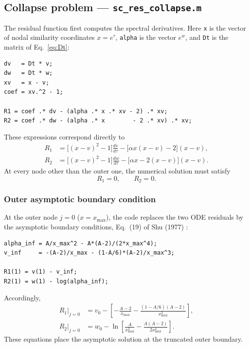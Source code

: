 \documentclass[11pt,a4paper]{article}
\begin{document}
\subsection{Collapse problem --- \texttt{sc\_res\_collapse.m}}
The residual function first computes the spectral derivatives. Here
\texttt{x} is the vector of nodal similarity coordinates $x=e^\tau$,
\texttt{alpha} is the vector $e^{w}$, and \texttt{Dt} is the matrix of
Eq.~\eqref{eq:Dt}:
\begin{lstlisting}[style=matlab]
dv   = Dt * v;
dw   = Dt * w;
xv   = x - v;
coef = xv.^2 - 1;

R1 = coef .* dv - (alpha .* x .* xv - 2) .* xv;
R2 = coef .* dw - (alpha .* x        - 2 .* xv) .* xv;
\end{lstlisting}
These expressions correspond directly to
\begin{align}
R_1 &=
\bigl[(x-v)^2-1\bigr]\frac{dv}{d\tau}
-
\bigl[\alpha x(x-v)-2\bigr](x-v),
\label{eq:R1}\\
R_2 &=
\bigl[(x-v)^2-1\bigr]\frac{dw}{d\tau}
-
\bigl[\alpha x-2(x-v)\bigr](x-v).
\label{eq:R2}
\end{align}
At every node other than the outer one, the numerical solution must
satisfy
\begin{equation}
R_1=0,
\qquad
R_2=0.
\end{equation}

\subsubsection{Outer asymptotic boundary condition}

At the outer node $j=0$ ($x=x_{\max}$), the code replaces the two ODE
residuals by the asymptotic boundary conditions, Eq.~(19) of
Shu (1977) \cite{shu1977}:
\begin{lstlisting}[style=matlab]
alpha_inf = A/x_max^2 - A*(A-2)/(2*x_max^4);
v_inf     = -(A-2)/x_max - (1-A/6)*(A-2)/x_max^3;

R1(1) = v(1) - v_inf;
R2(1) = w(1) - log(alpha_inf);
\end{lstlisting}
Accordingly,
\begin{align}
R_1\big|_{j=0}
&=
v_0
-
\left[
-\frac{A-2}{x_{\max}}
-
\frac{(1-A/6)(A-2)}{x_{\max}^3}
\right],
\label{eq:bcv}\\
R_2\big|_{j=0}
&=
w_0
-
\ln\left[
\frac{A}{x_{\max}^2}
-
\frac{A(A-2)}{2x_{\max}^4}
\right].
\label{eq:bca}
\end{align}
These equations place the asymptotic solution at the truncated outer
boundary.
\end{document}
